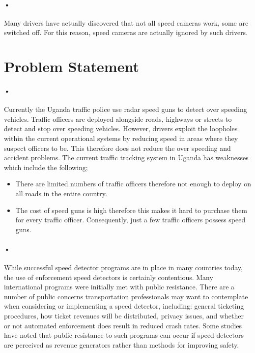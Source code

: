 \documentclass[12pt]{report}
\begin{document}
\paragraph{•}
Many drivers have actually discovered that not all speed cameras work, some are switched off. For this reason, speed cameras are actually ignored by such drivers.

\section{Problem Statement}
\paragraph{•}
Currently the Uganda traffic police use radar speed guns to detect over speeding vehicles. Traffic officers are deployed alongside roads, highways or streets to detect and stop over speeding vehicles. However, drivers exploit the loopholes within the current operational systems by reducing speed in areas where they suspect officers to be. This therefore does not reduce the over speeding and accident problems. The current traffic tracking system in Uganda has weaknesses which include the following;
\begin{itemize}
\item There are limited numbers of traffic officers therefore not enough to deploy on all roads in the entire country.
\item The cost of speed guns is high therefore this makes it hard to purchase them for every traffic officer. Consequently, just a few traffic officers possess speed guns. \cite{article4}
\end{itemize}
\paragraph{•}
While successful speed detector programs are in place in many countries today, the use of enforcement speed detectors is certainly contentious. Many international programs were initially met with public resistance. There are a number of public concerns transportation professionals may want to contemplate when considering or implementing a speed detector, including: general ticketing procedures, how ticket revenues will be distributed, privacy issues, and whether or not automated enforcement does result in reduced crash rates. Some studies have noted that public resistance to such programs can occur if speed detectors are perceived as revenue generators rather than methods for improving safety.
\end{document}
